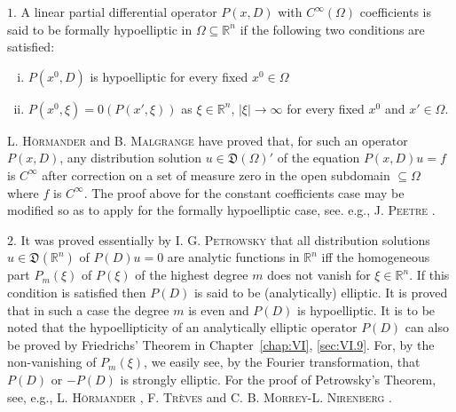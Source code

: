 $1$. A linear partial differential operator $P(x, D)$ with $C^\infty(\Omega)$ coefficients is said to be formally hypoelliptic in $\Omega \subseteq \mathbb{R}^{n}$ if the following two conditions are satisfied: \begin{enumerate}[i)]
\item $P(x^0, D)$ is hypoelliptic for every fixed $x^0 \in \Omega$
\item $P(x^0, \xi) = 0(P(x', \xi))$ as $\xi \in \mathbb{R}^{n}$, $|\xi| \to \infty$ for every fixed $x^0$ and $x' \in \Omega$.
\end{enumerate}
 L. \textsc{Hörmander} \cite{hormander117} and B. \textsc{Malgrange} \cite{malgrange187} have proved that, for such an operator $P(x, D)$, any distribution solution $u \in \mathfrak{D}(\Omega)'$ of the equation $P(x, D)u = f$ is $C^\infty$ after correction on a set of measure zero in the open subdomain $\subseteq \Omega$ where $f$ is $C^\infty$. The proof above for the constant coefficients case may be modified so as to apply for the formally hypoelliptic case, see. e.g., J. \textsc{Peetre} \cite{peetre246}. 

$2$. It was proved essentially by I. G. \textsc{Petrowsky} \cite{petrowsky248} that all distribution solutions $u \in \mathfrak{D}(\mathbb{R}^{n})$ of $P(D)u = 0$ are analytic functions in $\mathbb{R}^{n}$ iff the homogeneous part $P_m(\xi)$ of $P(\xi)$ of the highest degree $m$ does not vanish for $\xi \in \mathbb{R}^{n}$. If this condition is satisfied then $P(D)$ is said to be (analytically) elliptic. It is proved that in such a case the degree $m$ is even and $P(D)$ is hypoelliptic. It is to be noted that the hypoellipticity of an analytically elliptic operator $P(D)$ can also be proved by Friedrichs' Theorem in Chapter~\ref{chap:VI}, \ref{sec:VI.9}. For, by the non-vanishing of $P_m(\xi)$, we easily see, by the Fourier transformation, that $P(D)$ or $-P(D)$ is strongly elliptic. For the proof of Petrowsky's Theorem, see, e.g., L. \textsc{Hörmander} \cite{hormander118}, F. \textsc{Trèves} \cite{treves325} and C. B. \textsc{Morrey}-L. \textsc{Nirenberg} \cite{morrey214}. 
